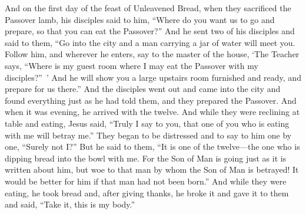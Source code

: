 \begin{biblechapter}
 And on the first day of the feast of Unleavened Bread, when they sacrificed the Passover lamb, his disciples said to him, “Where do you want us to go and prepare, so that you can eat the Passover?”
\verse And he sent two of his disciples and said to them, “Go into the city and a man carrying a jar of water will meet you. Follow him,
\verse and wherever he enters, say to the master of the house, ‘The Teacher says, “Where is my guest room where I may eat the Passover with my disciples?” ’
\verse And he will show you a large upstairs room furnished and ready, and prepare for us there.”
\verse And the disciples went out and came into the city and found everything just as he had told them, and they prepared the Passover.
\verse And when it was evening, he arrived with the twelve.
\verse And while they were reclining at table and eating, Jesus said, “Truly I say to you, that one of you who is eating with me will betray me.”
\verse They began to be distressed and to say to him one by one, “Surely not I?”
\verse But he said to them, “It is one of the twelve—the one who is dipping bread into the bowl with me.
\verse For the Son of Man is going just as it is written about him, but woe to that man by whom the Son of Man is betrayed! It would be better for him if that man had not been born.”
 And while they were eating, he took bread and, after giving thanks, he broke it and gave it to them and said, “Take it, this is my body.”

\end{biblechapter}
